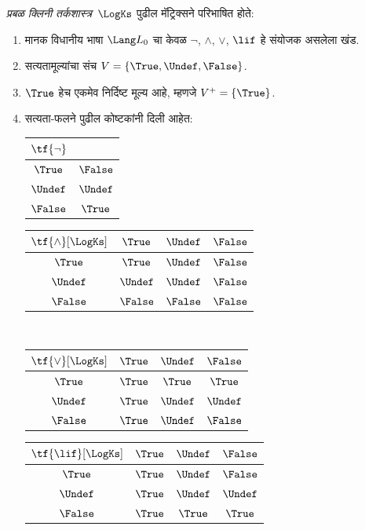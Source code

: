 \documentclass[../../../include/open-logic-section]{subfiles}
\begin{document}
\begin{defn}
\emph{प्रबळ क्लिनी तर्कशास्त्र}~$\LogKs$ पुढील मॅट्रिक्सने
परिभाषित होते:
\begin{enumerate}
  \item मानक विधानीय भाषा $\Lang L_0$ चा केवळ
  $\lnot$, $\land$, $\lor$, $\lif$ हे संयोजक असलेला खंड.
  \item सत्यतामूल्यांचा संच $V = \{\True, \Undef, \False\}$.
  \item $\True$ हेच एकमेव निर्दिष्ट मूल्य आहे, म्हणजे $V^+ = \{\True\}$.
  \item सत्यता-फलने पुढील कोष्टकांनी दिली आहेत:
  \begin{center}
    \begin{tabular}{c|c}
      $\tf{\lnot}$ & \\
      \hline
      $\True$ & $\False$ \\
      $\Undef$ & $\Undef$ \\
      $\False$ & $\True$
    \end{tabular}
    \quad
    \begin{tabular}{c|ccc}
      $\tf{\land}[\LogKs]$ & $\True$ & $\Undef$ & $\False$ \\
      \hline
      $\True$ & $\True$ & $\Undef$ & $\False$ \\
      $\Undef$ & $\Undef$ & $\Undef$ & $\False$\\
      $\False$ & $\False$ & $\False$ & $\False$
    \end{tabular}
    \\[2ex]
    \begin{tabular}{c|ccc}
      $\tf{\lor}[\LogKs]$ & $\True$ & $\Undef$ & $\False$ \\
      \hline
      $\True$ & $\True$ & $\True$ & $\True$ \\
      $\Undef$ & $\True$ & $\Undef$ & $\Undef$ \\
      $\False$ & $\True$ & $\Undef$ & $\False$
    \end{tabular}
    \quad
    \begin{tabular}{c|ccc}
      $\tf{\lif}[\LogKs]$ & $\True$ & $\Undef$ & $\False$ \\
      \hline
      $\True$ & $\True$ & $\Undef$ & $\False$ \\
      $\Undef$ & $\True$ & $\Undef$ & $\Undef$  \\
      $\False$ & $\True$ & $\True$ & $\True$
    \end{tabular}
  \end{center}
\end{enumerate}
\end{defn}
\end{document}

